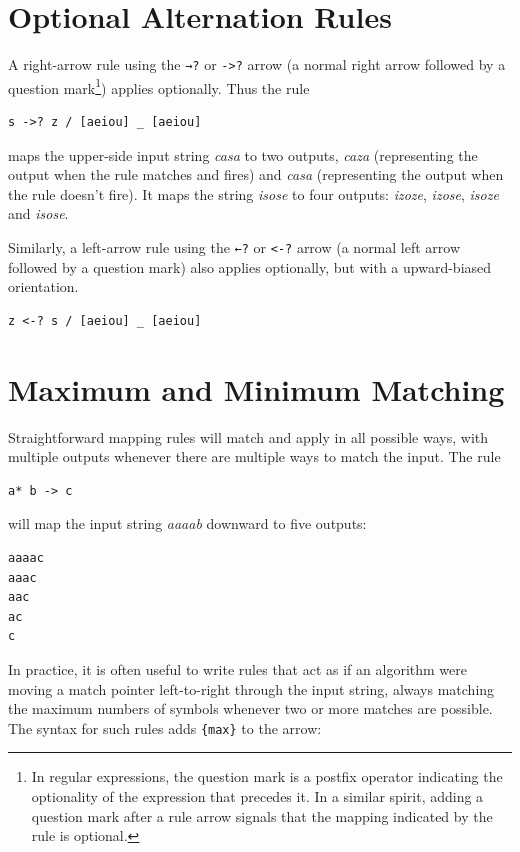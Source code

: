 \section{Optional Alternation Rules}

A right-arrow rule using the \texttt{→?} or \texttt{->?} arrow (a normal right arrow followed by a question
mark\footnote{In regular expressions, the question mark is a postfix operator indicating the optionality of the expression that
precedes it.  In a similar spirit, adding a question mark after a rule arrow signals that the mapping indicated by the rule is
optional.}) applies optionally.  Thus
the rule

\begin{Verbatim}
s ->? z / [aeiou] _ [aeiou]
\end{Verbatim}

\noindent
maps the upper-side input string \emph{casa} to two outputs, \emph{caza} (representing the output when
the rule matches and fires) and
\emph{casa} (representing the output when the rule doesn't fire).  It 
maps the string \emph{isose} to four outputs:
\emph{izoze}, \emph{izose}, \emph{isoze} and \emph{isose}.

Similarly, a left-arrow rule using the \texttt{←?} or \texttt{<-?} arrow (a normal left arrow followed by a question mark) also
applies optionally, but with a upward-biased orientation.

\begin{Verbatim}
z <-? s / [aeiou] _ [aeiou]
\end{Verbatim}

\section{Maximum and Minimum Matching}

Straightforward mapping rules will match and apply in all possible ways, with multiple outputs
whenever there are multiple ways to match the input.  The rule

\begin{Verbatim}
a* b -> c
\end{Verbatim}

\noindent
will map the input string \emph{aaaab} downward to five outputs:

\begin{Verbatim}
aaaac
aaac
aac
ac
c
\end{Verbatim}


In practice, it is often useful to write rules that act as
if an algorithm were moving a match pointer left-to-right through the input string, always matching the
	maximum numbers of symbols whenever two or more matches are possible.  The syntax for such rules
	adds \verb!{max}! to the arrow:

